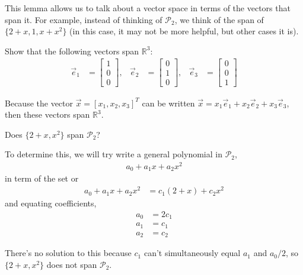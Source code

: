 This lemma allows us to talk about a vector space in terms of the vectors that span it.  For example, instead of thinking of $\mathcal{P}_2$, we think of the span of $\{2+x,1,x+x^2\}$ (in this case, it may not be more helpful, but other cases it is).  

\begin{example}
 Show that the following vectors span $\mathbb{R}^3$:
\begin{align*}
 \vec{e}_1 & = 
\begin{bmatrix}
 1 \\ 0 \\ 0 
\end{bmatrix}, & \vec{e}_2 & = 
\begin{bmatrix}
 0 \\ 1 \\ 0 
\end{bmatrix}, & \vec{e}_3 & = 
\begin{bmatrix}
 0 \\ 0 \\ 1
\end{bmatrix}
\end{align*}

\solution 

Because the vector $\vec{x}=[x_1,x_2,x_3]^T$ can be written $\vec{x}=x_1 \vec{e}_1 + x_2 \vec{e}_2 + x_3 \vec{e}_3$, then these vectors span $\mathbb{R}^3$.  
\end{example}


\begin{example}
Does $\{2+x,x^2 \}$ span $\mathcal{P}_2$?  

\solution 

To determine this, we will try write a general polynomial in $\mathcal{P}_2$, 
%
\begin{align*}
a_0 + a_1 x + a_2 x^2
\end{align*}
in term of the set or 
%
\begin{align*}
a_0 + a_1 x + a_2 x^2 & = c_1 (2+x) + c_2 x^2
\end{align*}
and equating coefficients, 
%
\begin{align*}
a_0 & = 2c_1  \\
a_1 & = c_1 \\
a_2 & = c_2
\end{align*}

There's no solution to this because $c_1$ can't simultaneously equal $a_1$ and $a_0/2$, so  $\{2+x,x^2\}$ does not span $\mathcal{P}_2$.  
\end{example}


